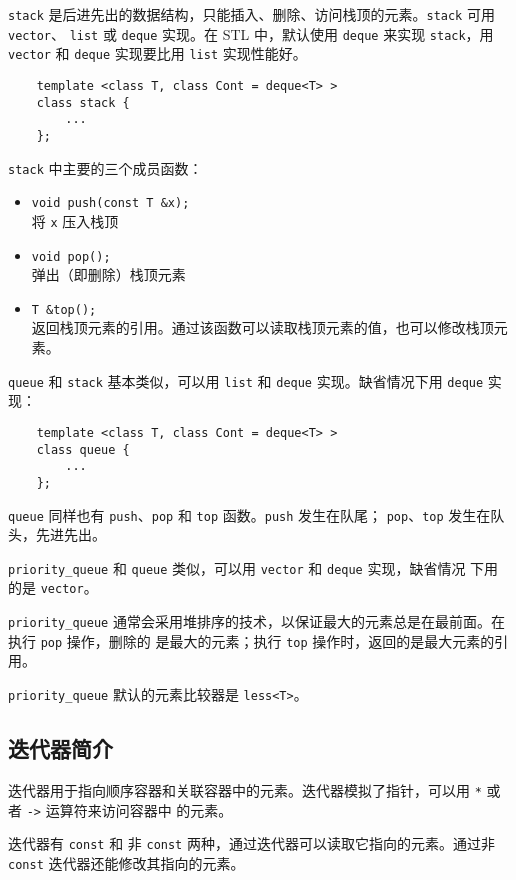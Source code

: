 \documentclass[UTF8]{ctexart}
\begin{document}
\texttt{stack} 是后进先出的数据结构，只能插入、删除、访问栈顶的元素。\texttt{stack} 可用 \texttt{vector}、
\texttt{list} 或 \texttt{deque} 实现。在 STL 中，默认使用 \texttt{deque} 来实现 \texttt{stack}，用
\texttt{vector} 和 \texttt{deque} 实现要比用 \texttt{list} 实现性能好。
\begin{verbatim}
    template <class T, class Cont = deque<T> >
    class stack {
        ...
    };
\end{verbatim}

\texttt{stack} 中主要的三个成员函数：
\begin{itemize}
    \item \texttt{void push(const T \&x);} \\
    将 \texttt{x} 压入栈顶
    \item \texttt{void pop();} \\
    弹出（即删除）栈顶元素
    \item \texttt{T \&top();} \\
    返回栈顶元素的引用。通过该函数可以读取栈顶元素的值，也可以修改栈顶元素。
\end{itemize}

\texttt{queue} 和 \texttt{stack} 基本类似，可以用 \texttt{list} 和 \texttt{deque} 实现。缺省情况下用
\texttt{deque} 实现：
\begin{verbatim}
    template <class T, class Cont = deque<T> >
    class queue {
        ...
    };
\end{verbatim}

\texttt{queue} 同样也有 \texttt{push}、\texttt{pop} 和 \texttt{top} 函数。\texttt{push} 发生在队尾；
\texttt{pop}、\texttt{top} 发生在队头，先进先出。

\texttt{priority\_queue} 和 \texttt{queue} 类似，可以用 \texttt{vector} 和 \texttt{deque} 实现，缺省情况
下用的是 \texttt{vector}。

\texttt{priority\_queue} 通常会采用堆排序的技术，以保证最大的元素总是在最前面。在执行 \texttt{pop} 操作，删除的
是最大的元素；执行 \texttt{top} 操作时，返回的是最大元素的引用。

\texttt{priority\_queue} 默认的元素比较器是 \texttt{less<T>}。

\subsection{迭代器简介}
迭代器用于指向顺序容器和关联容器中的元素。迭代器模拟了指针，可以用 \texttt{*} 或者 \texttt{->} 运算符来访问容器中
的元素。

迭代器有 \texttt{const} 和 非 \texttt{const} 两种，通过迭代器可以读取它指向的元素。通过非
\texttt{const} 迭代器还能修改其指向的元素。
\end{document}
